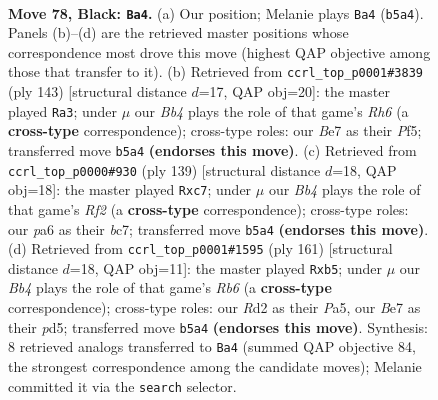 \documentclass[11pt]{article}
\begin{document}
\clearpage

\begin{figure}[p]\centering
\begin{subfigure}{0.46\textwidth}\centering
\resizebox{\linewidth}{!}{%
\newchessgame
\chessboard[
  setfen={8/4bk2/P6R/1b3p2/5P2/8/3r4/6K1 b - - 1 78},
  showmover=false,
  pgfstyle=straightmove, color=movearrow, markmove={b5-a4}
]}
\caption{}
\end{subfigure}\hfill
\begin{subfigure}{0.46\textwidth}\centering
\resizebox{\linewidth}{!}{%
\newchessgame
\chessboard[
  setfen={8/8/5k2/P4p2/1R5P/7r/3K4/8 b - - 0 72},
  showmover=false,
  pgfstyle=straightmove, color=movearrow, markmove={h3-a3}
]}
\caption{}
\end{subfigure}
\\[4pt]
\begin{subfigure}{0.46\textwidth}\centering
\resizebox{\linewidth}{!}{%
\newchessgame
\chessboard[
  setfen={8/2B2r2/4R2P/2k5/7K/5b2/8/8 b - - 0 70},
  showmover=false,
  pgfstyle=straightmove, color=movearrow, markmove={f7-c7}
]}
\caption{}
\end{subfigure}\hfill
\begin{subfigure}{0.46\textwidth}\centering
\resizebox{\linewidth}{!}{%
\newchessgame
\chessboard[
  setfen={8/6k1/3p4/pP1P3K/4PR2/1r6/8/8 b - - 0 81},
  showmover=false,
  pgfstyle=straightmove, color=movearrow, markmove={b3-b5}
]}
\caption{}
\end{subfigure}
\caption{\textbf{Move 78, Black: \texttt{Ba4}.} (a) Our position; Melanie plays \texttt{Ba4} (\texttt{b5a4}). Panels (b)--(d) are the retrieved master positions whose correspondence most drove this move (highest QAP objective among those that transfer to it). (b) Retrieved from \texttt{ccrl\_top\_p0001\#3839} (ply 143) [structural distance $d$=17, QAP obj=20]: the master played \texttt{Ra3}; under $\mu$ our \emph{Bb4} plays the role of that game's \emph{Rh6} (a \textbf{cross-type} correspondence); cross-type roles: our \emph{B}e7 as their \emph{P}f5; transferred move \texttt{b5a4} \textbf{(endorses this move)}. (c) Retrieved from \texttt{ccrl\_top\_p0000\#930} (ply 139) [structural distance $d$=18, QAP obj=18]: the master played \texttt{Rxc7}; under $\mu$ our \emph{Bb4} plays the role of that game's \emph{Rf2} (a \textbf{cross-type} correspondence); cross-type roles: our \emph{p}a6 as their \emph{b}c7; transferred move \texttt{b5a4} \textbf{(endorses this move)}. (d) Retrieved from \texttt{ccrl\_top\_p0001\#1595} (ply 161) [structural distance $d$=18, QAP obj=11]: the master played \texttt{Rxb5}; under $\mu$ our \emph{Bb4} plays the role of that game's \emph{Rb6} (a \textbf{cross-type} correspondence); cross-type roles: our \emph{R}d2 as their \emph{P}a5, our \emph{B}e7 as their \emph{p}d5; transferred move \texttt{b5a4} \textbf{(endorses this move)}. Synthesis: 8 retrieved analogs transferred to \texttt{Ba4} (summed QAP objective 84, the strongest correspondence among the candidate moves); Melanie committed it via the \texttt{search} selector.}
\label{fig:thought-m155}
\end{figure}
\end{document}
